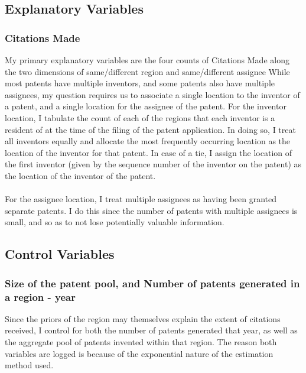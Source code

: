 \documentclass[12pt]{article}
\begin{document}
\subsection{Explanatory Variables}
\subsubsection{Citations Made}
My primary explanatory variables are the four counts of Citations Made along the two dimensions of same/different region and same/different assignee
While most patents have multiple inventors, and some patents also have multiple assignees, my question requires us to associate a single location to the inventor of a patent, and a single location for the assignee of the patent. For the inventor location, I tabulate the count of each of the regions that each inventor is a resident of at the time of the filing of the patent application. In doing so, I treat all inventors equally and allocate the most frequently occurring location as the location of the inventor for that patent. In case of a tie, I assign the location of the first inventor (given by the sequence number of the inventor on the patent) as the location of the inventor of the patent. 
\\\\
For the assignee location, I treat multiple assignees as having been granted separate patents. I do this since the number of patents with multiple assignees is small, and so as to not lose potentially valuable information.



\begin{table}
\begin{center}
\begin{spacing}{0.9}

\end{spacing}
\end{center}
\end{table}

\subsection{Control Variables}
\subsubsection{Size of the patent pool, and Number of patents generated in a region - year}
Since the priors of the region may themselves explain the extent of citations received, I control for both the number of patents generated that year, as well as the aggregate pool of patents invented within that region. The reason both variables are logged is because of the exponential nature of the estimation method used.
\end{document}
